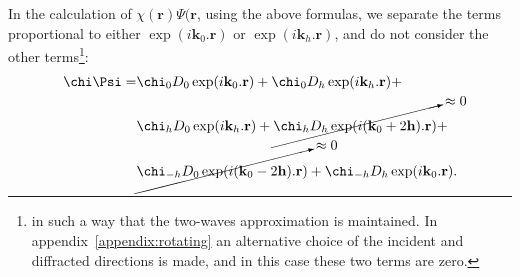 \documentclass[preprint]{iucr}              %
\begin{document}
In the calculation of $\chi(\textbf{r}) \Psi(\textbf{r}$, using the above formulas, we separate the terms proportional to either $\exp(i \textbf{k}_0 . \textbf{r})$ or $\exp(i \textbf{k}_h . \textbf{r})$, and do not consider the other terms\footnote{
in such a way that the two-waves approximation is maintained. In appendix~\ref{appendix:rotating} an alternative choice of the incident and diffracted directions is made, and in this case these two terms are zero.
}:
\begin{subequations}
\label{eq:approxchiPsi}
\begin{align}
\chi\Psi =&
\chi_0 D_0 \exp(i \textbf{k}_0 . \textbf{r}) +
\chi_0 D_h \exp(i \textbf{k}_h . \textbf{r}) + \nonumber \\
&\chi_h D_0 \exp(i \textbf{k}_h . \textbf{r}) +
\cancelto{\approx 0}{\chi_h D_h \exp(i (\textbf{k}_0+2\textbf{h}) . \textbf{r})} + \nonumber \\
&\cancelto{\approx 0}{\chi_{-h} D_0 \exp(i (\textbf{k}_0 - 2 \textbf{h}) .\textbf{r})} +
\chi_{-h} D_h \exp(i \textbf{k}_0 . \textbf{r}).
\end{align}
\end{subequations}



\end{document}
